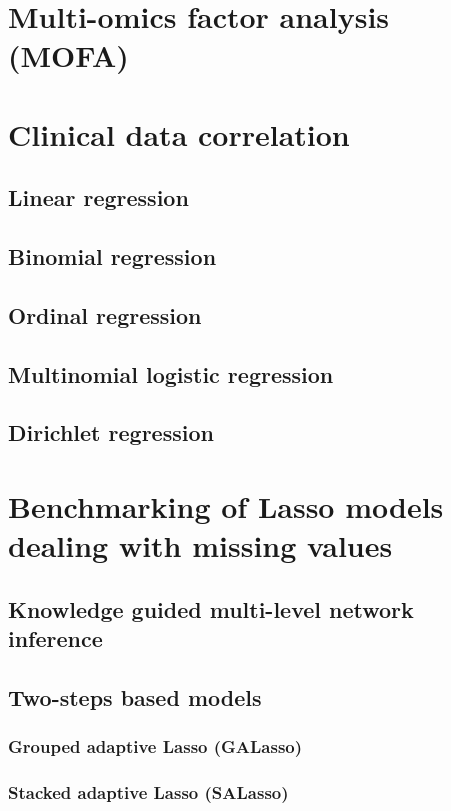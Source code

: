 \section{Multi-omics factor analysis (MOFA)}

\lipsum[1]

\section{Clinical data correlation}
    \subsection{Linear regression}
    \subsection{Binomial regression}
    \subsection{Ordinal regression}
    \subsection{Multinomial logistic regression}
    \subsection{Dirichlet regression}
    
\section{Benchmarking of Lasso models dealing with missing values}
    \subsection{Knowledge guided multi-level network inference}
    \subsection{Two-steps based models}
        \subsubsection{Grouped adaptive Lasso (GALasso)}
        \subsubsection{Stacked adaptive Lasso (SALasso)}
